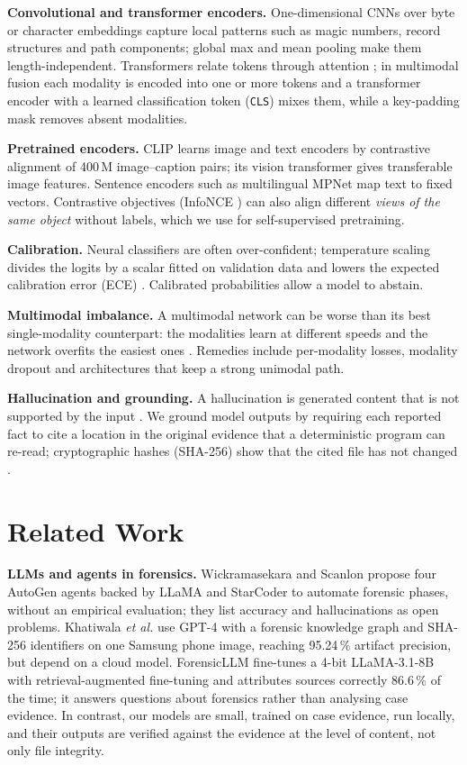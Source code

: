 \documentclass[conference]{IEEEtran}
\begin{document}
\textbf{Convolutional and transformer encoders.} One-dimensional CNNs over byte or character embeddings capture
local patterns such as magic numbers, record structures and path components; global max and mean pooling make them
length-independent. Transformers relate tokens through attention \cite{vaswani2017}; in multimodal fusion each
modality is encoded into one or more tokens and a transformer encoder with a learned classification token
(\texttt{CLS}) mixes them, while a key-padding mask removes absent modalities.

\textbf{Pretrained encoders.} CLIP \cite{clip} learns image and text encoders by contrastive alignment of 400\,M
image--caption pairs; its vision transformer gives transferable image features. Sentence encoders such as
multilingual MPNet \cite{sbert} map text to fixed vectors. Contrastive objectives (InfoNCE \cite{oord2018}) can also
align different \emph{views of the same object} without labels, which we use for self-supervised pretraining.

\textbf{Calibration.} Neural classifiers are often over-confident; temperature scaling divides the logits by a
scalar fitted on validation data and lowers the expected calibration error (ECE) \cite{guo2017}. Calibrated
probabilities allow a model to abstain.

\textbf{Multimodal imbalance.} A multimodal network can be worse than its best single-modality counterpart: the
modalities learn at different speeds and the network overfits the easiest ones \cite{wang2020}. Remedies include
per-modality losses, modality dropout and architectures that keep a strong unimodal path.

\textbf{Hallucination and grounding.} A hallucination is generated content that is not supported by the input
\cite{kalai2025,ji2023}. We ground model outputs by requiring each reported fact to cite a location in the original
evidence that a deterministic program can re-read; cryptographic hashes (SHA-256) show that the cited file has not
changed \cite{carrier2005}.

\section{Related Work}

\textbf{LLMs and agents in forensics.} Wickramasekara and Scanlon \cite{wickramasekara2024} propose four AutoGen agents
backed by LLaMA and StarCoder to automate forensic phases, without an empirical evaluation; they list accuracy and
hallucinations as open problems. Khatiwala \emph{et al.} \cite{khatiwala2026} use GPT-4 with a forensic knowledge
graph and SHA-256 identifiers on one Samsung phone image, reaching 95.24\,\% artifact precision, but depend on a cloud
model. ForensicLLM \cite{forensicllm} fine-tunes a 4-bit LLaMA-3.1-8B with retrieval-augmented fine-tuning and
attributes sources correctly 86.6\,\% of the time; it answers questions about forensics rather than analysing case
evidence. In contrast, our models are small, trained on case evidence, run locally, and their outputs are verified
against the evidence at the level of content, not only file integrity.
\end{document}
